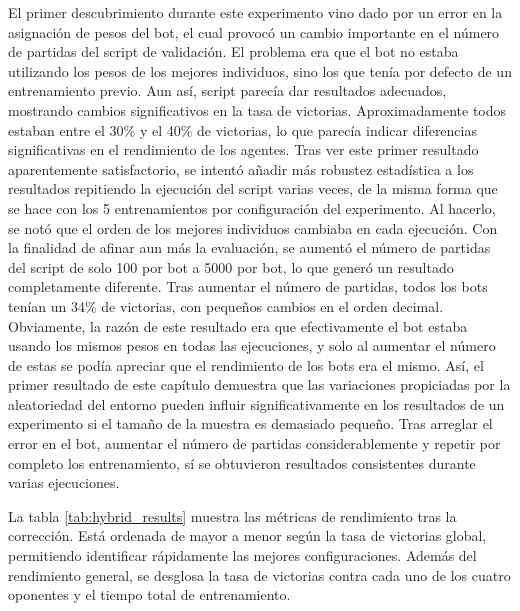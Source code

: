 El primer descubrimiento durante este experimento vino dado por un error en la asignación de pesos del bot, el cual provocó un cambio importante en el número de partidas del script de validación. El problema era que el bot no estaba utilizando los pesos de los mejores individuos, sino los que tenía por defecto de un entrenamiento previo. Aun así, script parecía dar resultados adecuados, mostrando cambios significativos en la tasa de victorias. Aproximadamente todos estaban entre el 30\% y el 40\% de victorias, lo que parecía indicar diferencias significativas en el rendimiento de los agentes. Tras ver este primer resultado aparentemente satisfactorio, se intentó añadir más robustez estadística a los resultados repitiendo la ejecución del script varias veces, de la misma forma que se hace con los 5 entrenamientos por configuración del experimento. Al hacerlo, se notó que el orden de los mejores individuos cambiaba en cada ejecución. Con la finalidad de afinar aun más la evaluación, se aumentó el número de partidas del script de solo 100 por bot a 5000 por bot, lo que generó un resultado completamente diferente. Tras aumentar el número de partidas, todos los bots tenían un 34\% de victorias, con pequeños cambios en el orden decimal. Obviamente, la razón de este resultado era que efectivamente el bot estaba usando los mismos pesos en todas las ejecuciones, y solo al aumentar el número de estas se podía apreciar que el rendimiento de los bots era el mismo. Así, el primer resultado de este capítulo demuestra que las variaciones propiciadas por la aleatoriedad del entorno pueden influir significativamente en los resultados de un experimento si el tamaño de la muestra es demasiado pequeño. Tras arreglar el error en el bot, aumentar el número de partidas considerablemente y repetir por completo los entrenamiento, sí se obtuvieron resultados consistentes durante varias ejecuciones.

La tabla \ref{tab:hybrid_results} muestra las métricas de rendimiento tras la corrección. Está ordenada de mayor a menor según la tasa de victorias global, permitiendo identificar rápidamente las mejores configuraciones. Además del rendimiento general, se desglosa la tasa de victorias contra cada uno de los cuatro oponentes y el tiempo total de entrenamiento.

